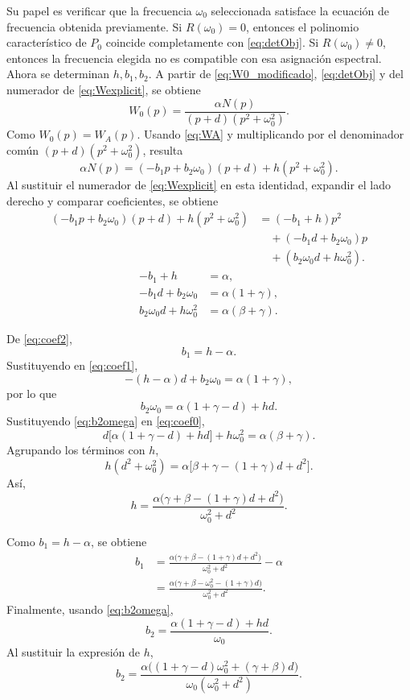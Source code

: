 \documentclass[journal]{IEEEtran}
\begin{document}
\noindent Su papel es verificar que la frecuencia \(\omega_0\)
seleccionada satisface la ecuación de frecuencia obtenida previamente. Si \(R(\omega_0)=0\), entonces el polinomio característico de \(P_0\) coincide completamente con \eqref{eq:detObj}. Si \(R(\omega_0)\neq 0\), entonces la frecuencia elegida no es compatible
con esa asignación espectral.
\noindent Ahora se determinan \(h,b_1,b_2\). A partir de \eqref{eq:W0_modificado}, \eqref{eq:detObj} y del numerador de \eqref{eq:Wexplicit}, se obtiene
\begin{equation}
W_0(p)=\frac{\alpha N(p)}{(p+d)(p^2+\omega_0^2)}.
\end{equation}
Como \(W_0(p)=W_A(p)\). Usando \eqref{eq:WA} y multiplicando por el denominador común \((p+d)(p^2+\omega_0^2)\), resulta
\begin{equation}
\alpha N(p)
=
(-b_1p+b_2\omega_0)(p+d)+h(p^2+\omega_0^2).
\end{equation}
Al sustituir el numerador de \eqref{eq:Wexplicit} en esta identidad, expandir el lado derecho y comparar coeficientes, se obtiene
\begin{align}
(-b_1p+b_2\omega_0)(p+d)+h(p^2+\omega_0^2)
&=(-b_1+h)p^2\\
&\quad +(-b_1d+b_2\omega_0)p\\
&\quad +(b_2\omega_0 d+h\omega_0^2).
\end{align}
\begin{align}
-b_1+h&=\alpha, \label{eq:coef2}\\
-b_1d+b_2\omega_0&=\alpha(1+\gamma), \label{eq:coef1}\\
b_2\omega_0 d+h\omega_0^2&=\alpha(\beta+\gamma). \label{eq:coef0}
\end{align}

De \eqref{eq:coef2},
\[
b_1=h-\alpha.
\]
Sustituyendo en \eqref{eq:coef1},
\[
-(h-\alpha)d+b_2\omega_0=\alpha(1+\gamma),
\]
por lo que
\begin{equation}
b_2\omega_0=\alpha(1+\gamma-d)+hd. \label{eq:b2omega}
\end{equation}
Sustituyendo \eqref{eq:b2omega} en \eqref{eq:coef0},
\[
d\bigl[\alpha(1+\gamma-d)+hd\bigr]+h\omega_0^2
=
\alpha(\beta+\gamma).
\]
Agrupando los términos con \(h\),
\[
h(d^2+\omega_0^2)
=
\alpha\bigl[\beta+\gamma-(1+\gamma)d+d^2\bigr].
\]
Así,
\begin{equation}
h=
\frac{\alpha\bigl(\gamma+\beta-(1+\gamma)d+d^2\bigr)}
{\omega_0^2+d^2}.
\end{equation}

Como \(b_1=h-\alpha\), se obtiene
\begin{align}
b_1
&=
\frac{\alpha\bigl(\gamma+\beta-(1+\gamma)d+d^2\bigr)}
{\omega_0^2+d^2}
-\alpha\\
&=
\frac{\alpha\bigl(\gamma+\beta-\omega_0^2-(1+\gamma)d\bigr)}
{\omega_0^2+d^2}.
\end{align}
Finalmente, usando \eqref{eq:b2omega},
\[
b_2=\frac{\alpha(1+\gamma-d)+hd}{\omega_0}.
\]
Al sustituir la expresión de \(h\),
\begin{equation}
b_2=
\frac{\alpha\bigl((1+\gamma-d)\omega_0^2+(\gamma+\beta)d\bigr)}
{\omega_0(\omega_0^2+d^2)}.
\end{equation}
\end{document}
